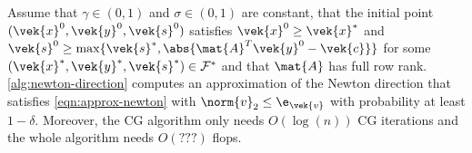 \begin{theorem}\label{thm:approximate-newton-convergence}
  Assume that \(\gamma \in (0, 1)\) and \(\sigma \in (0, 1)\) are constant, that the initial point \((\vek{x}^0, \vek{y}^0, \vek{s}^0)\) satisfies \(\vek{x}^0 \geq \vek{x}^*\) and \(\vek{s}^0 \geq \max \{\vek{s}^*, \abs{\mat{A}^T \vek{y}^0 - \vek{c}}\}\) for some \((\vek{x}^*, \vek{y}^*, \vek{s}^*) \in \mathcal{F}^*\) and that \(\mat{A}\) has full row rank. \cref{alg:newton-direction} computes an approximation of the Newton direction that satisfies \cref{eqn:approx-newton} with \(\norm{v}_2 \leq \e_{\vek{v}}\) with probability at least \(1 - \delta\).
  Moreover, the CG algorithm only needs \(O(\log(n))\) CG iterations and the whole algorithm needs \(O(???)\) flops.
\end{theorem}